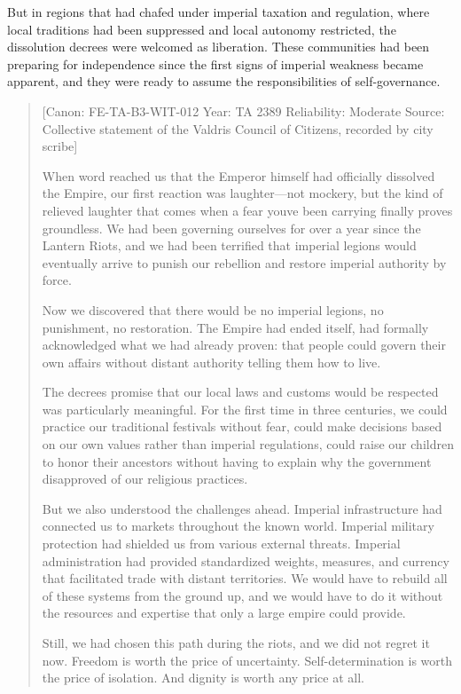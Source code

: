 But in regions that had chafed under imperial taxation and regulation,
where local traditions had been suppressed and local autonomy
restricted, the dissolution decrees were welcomed as liberation. These
communities had been preparing for independence since the first signs of
imperial weakness became apparent, and they were ready to assume the
responsibilities of self-governance.

\begin{quote}
{[}Canon: FE-TA-B3-WIT-012 \textbar{} Year: TA 2389 \textbar{}
Reliability: Moderate \textbar{} Source: Collective statement of the
Valdris Council of Citizens, recorded by city scribe{]}

When word reached us that the Emperor himself had officially dissolved
the Empire, our first reaction was laughter---not mockery, but the kind
of relieved laughter that comes when a fear you\textquotesingle ve been
carrying finally proves groundless. We had been governing ourselves for
over a year since the Lantern Riots, and we had been terrified that
imperial legions would eventually arrive to punish our rebellion and
restore imperial authority by force.

Now we discovered that there would be no imperial legions, no
punishment, no restoration. The Empire had ended itself, had formally
acknowledged what we had already proven: that people could govern their
own affairs without distant authority telling them how to live.

The decree\textquotesingle s promise that our local laws and customs
would be respected was particularly meaningful. For the first time in
three centuries, we could practice our traditional festivals without
fear, could make decisions based on our own values rather than imperial
regulations, could raise our children to honor their ancestors without
having to explain why the government disapproved of our religious
practices.

But we also understood the challenges ahead. Imperial infrastructure had
connected us to markets throughout the known world. Imperial military
protection had shielded us from various external threats. Imperial
administration had provided standardized weights, measures, and currency
that facilitated trade with distant territories. We would have to
rebuild all of these systems from the ground up, and we would have to do
it without the resources and expertise that only a large empire could
provide.

Still, we had chosen this path during the riots, and we did not regret
it now. Freedom is worth the price of uncertainty. Self-determination is
worth the price of isolation. And dignity is worth any price at all.
\end{quote}


